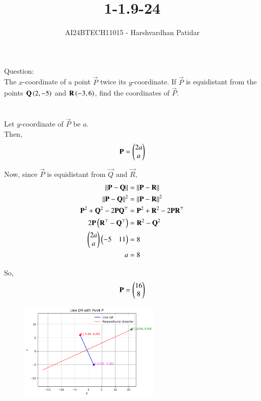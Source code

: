 \documentclass[journal]{IEEEtran}
\begin{document}

\vspace{3cm}

\title{1-1.9-24}
\author{AI24BTECH11015 - Harshvardhan Patidar}
 \maketitle
{\let\newpage\relax\maketitle}

\renewcommand{\thefigure}{\theenumi}
\renewcommand{\thetable}{\theenumi}
\setlength{\intextsep}{10pt} %


\renewcommand{\thetable}{\theenumi}


	Question:\\
		The $x$-coordinate of a point $\vec{P}$ twice its $y$-coordinate. If $\vec{P}$ is equidistant from the points $\mathbf{Q} \left(2,-5\right)$ and $\mathbf{R} \left(-3,6\right)$, find the coordinates of $\vec{P}$.\\ \\


	\solution\\
		Let $y$-coordinate of $\vec{P}$ be $a$.\\
		Then, 
			\begin{align*}
				\mathbf{P} = \begin{pmatrix}2a\\a\end{pmatrix}
			\end{align*}

		Now, since $\vec{P}$ is equidistant from $\vec{Q}$ and $\vec{R}$,
			\begin{align}
				\lVert \mathbf{P} - \mathbf{Q} \rVert  &=  \lVert \mathbf{P} - \mathbf{R} \rVert\\
				\lVert \mathbf{P} - \mathbf{Q} \rVert ^ 2  &=  \lVert \mathbf{P} - \mathbf{R} \rVert ^ 2\\
				\mathbf{P}^2 + \mathbf{Q}^2 - 2 \mathbf{P}\mathbf{Q}^{\top} &= \mathbf{P}^2 + \mathbf{R}^2 - 2\mathbf{P}\mathbf{R}^{\top}\\
				2\mathbf{P} \left(\mathbf{R}^{\top} - \mathbf{Q}^{\top}\right) &= \mathbf{R}^2 - \mathbf{Q}^2\\
				\begin{pmatrix}2a\\a\end{pmatrix}\begin{pmatrix}-5&11\end{pmatrix} &= 8 \\
				a&=8
			\end{align}

			So, $$\mathbf{P} = \begin{pmatrix}16\\8\end{pmatrix}$$

			               
	\begin{figure}[H]
		\centering
		\includegraphics[width=0.6\textwidth]{plots/plot.png}
	\end{figure}
		
  
\end{document}
